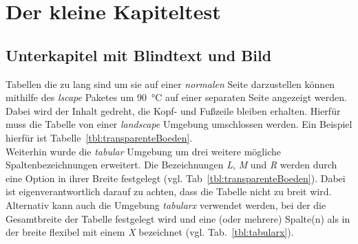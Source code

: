 \chapter{Der kleine Kapiteltest}
	\blindtext

\section{Unterkapitel mit Blindtext und Bild}
	\blindtext
	
	Tabellen die zu lang sind um sie auf einer \emph{normalen} Seite darzustellen können mithilfe des \emph{lscape} Paketes um \SI{90}{\celsius} auf einer separaten Seite angezeigt werden. Dabei wird der Inhalt gedreht, die Kopf- und Fußzeile bleiben erhalten. Hierfür muss die Tabelle von einer \emph{landscape} Umgebung umschlossen werden. Ein Beispiel hierfür ist Tabelle~\ref{tbl:transparenteBoeden}.\\
	Weiterhin wurde die \emph{tabular} Umgebung um drei weitere mögliche Spaltenbezeichnungen erweitert. Die Bezeichnungen \emph{L}, \emph{M} und \emph{R} werden durch eine Option in ihrer Breite festgelegt (vgl. Tab~\ref{tbl:transparenteBoeden}). Dabei ist eigenverantwortlich darauf zu achten, dass die Tabelle nicht zu breit wird.\\
	Alternativ kann auch die Umgebung \emph{tabularx} verwendet werden, bei der die Gesamtbreite der Tabelle festgelegt wird und eine (oder mehrere) Spalte(n) als in der breite flexibel mit einem \emph{X} bezeichnet (vgl. Tab.~\ref{tbl:tabularx}).
	
